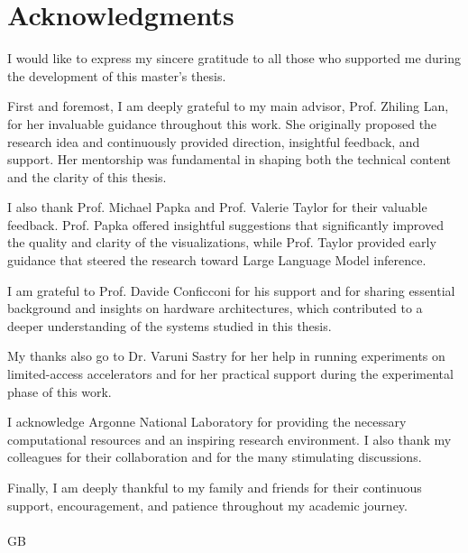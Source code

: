 \chapter*{Acknowledgments}

I would like to express my sincere gratitude to all those who supported me during the development of this master’s thesis.

First and foremost, I am deeply grateful to my main advisor, Prof. Zhiling Lan, for her invaluable guidance throughout this work. She originally proposed the research idea and continuously provided direction, insightful feedback, and support. Her mentorship was fundamental in shaping both the technical content and the clarity of this thesis.

I also thank Prof. Michael Papka and Prof. Valerie Taylor for their valuable feedback. Prof. Papka offered insightful suggestions that significantly improved the quality and clarity of the visualizations, while Prof. Taylor provided early guidance that steered the research toward Large Language Model inference.

I am grateful to Prof. Davide Conficconi for his support and for sharing essential background and insights on hardware architectures, which contributed to a deeper understanding of the systems studied in this thesis.

My thanks also go to Dr. Varuni Sastry for her help in running experiments on limited-access accelerators and for her practical support during the experimental phase of this work.

I acknowledge Argonne National Laboratory for providing the necessary computational resources and an inspiring research environment. I also thank my colleagues for their collaboration and for the many stimulating discussions.

Finally, I am deeply thankful to my family and friends for their continuous support, encouragement, and patience throughout my academic journey.
\\ \\
GB
